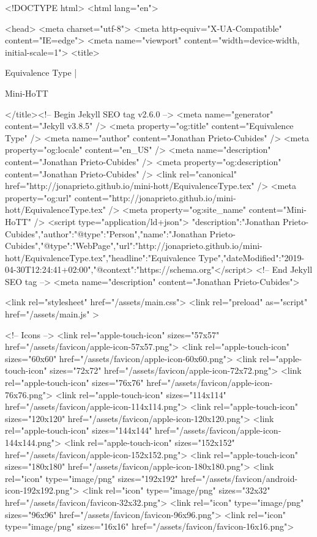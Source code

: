 <!DOCTYPE html>
<html lang="en">

<head>
  <meta charset="utf-8">
  <meta http-equiv="X-UA-Compatible" content="IE=edge">
  <meta name="viewport" content="width=device-width, initial-scale=1">
  <title>
    
      
        Equivalence Type |
      
        Mini-HoTT
    
  </title><!-- Begin Jekyll SEO tag v2.6.0 -->
<meta name="generator" content="Jekyll v3.8.5" />
<meta property="og:title" content="Equivalence Type" />
<meta name="author" content="Jonathan Prieto-Cubides" />
<meta property="og:locale" content="en_US" />
<meta name="description" content="Jonathan Prieto-Cubides" />
<meta property="og:description" content="Jonathan Prieto-Cubides" />
<link rel="canonical" href="http://jonaprieto.github.io/mini-hott/EquivalenceType.tex" />
<meta property="og:url" content="http://jonaprieto.github.io/mini-hott/EquivalenceType.tex" />
<meta property="og:site_name" content="Mini-HoTT" />
<script type="application/ld+json">
{"description":"Jonathan Prieto-Cubides","author":{"@type":"Person","name":"Jonathan Prieto-Cubides"},"@type":"WebPage","url":"http://jonaprieto.github.io/mini-hott/EquivalenceType.tex","headline":"Equivalence Type","dateModified":"2019-04-30T12:24:41+02:00","@context":"https://schema.org"}</script>
<!-- End Jekyll SEO tag -->
<meta name="description" content="Jonathan Prieto-Cubides">

  <link rel="stylesheet" href="/assets/main.css">
  <link rel="preload" as="script" href="/assets/main.js" >

  <!-- Icons -->
  <link rel="apple-touch-icon" sizes="57x57" href="/assets/favicon/apple-icon-57x57.png">
  <link rel="apple-touch-icon" sizes="60x60" href="/assets/favicon/apple-icon-60x60.png">
  <link rel="apple-touch-icon" sizes="72x72" href="/assets/favicon/apple-icon-72x72.png">
  <link rel="apple-touch-icon" sizes="76x76" href="/assets/favicon/apple-icon-76x76.png">
  <link rel="apple-touch-icon" sizes="114x114" href="/assets/favicon/apple-icon-114x114.png">
  <link rel="apple-touch-icon" sizes="120x120" href="/assets/favicon/apple-icon-120x120.png">
  <link rel="apple-touch-icon" sizes="144x144" href="/assets/favicon/apple-icon-144x144.png">
  <link rel="apple-touch-icon" sizes="152x152" href="/assets/favicon/apple-icon-152x152.png">
  <link rel="apple-touch-icon" sizes="180x180" href="/assets/favicon/apple-icon-180x180.png">
  <link rel="icon" type="image/png" sizes="192x192"  href="/assets/favicon/android-icon-192x192.png">
  <link rel="icon" type="image/png" sizes="32x32" href="/assets/favicon/favicon-32x32.png">
  <link rel="icon" type="image/png" sizes="96x96" href="/assets/favicon/favicon-96x96.png">
  <link rel="icon" type="image/png" sizes="16x16" href="/assets/favicon/favicon-16x16.png">

